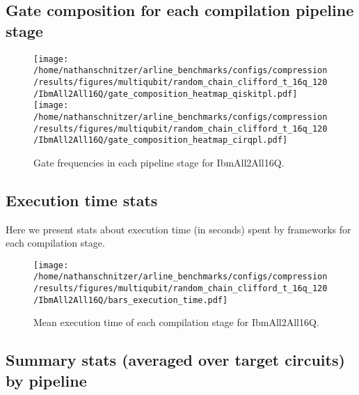 \documentclass{report}%
\begin{document}
%
\clearpage%
\subsection*{Gate composition for each compilation pipeline stage}%
\label{subsec:Gatecompositionforeachcompilationpipelinestage}%

%


\begin{figure}[h!]%
\centering%
\texttt{[image: /home/nathanschnitzer/arline\_benchmarks/configs/compression/results/figures/multiqubit/random\_chain\_clifford\_t\_16q\_120/IbmAll2All16Q/gate\_composition\_heatmap\_qiskitpl.pdf]}%
\centering%
\texttt{[image: /home/nathanschnitzer/arline\_benchmarks/configs/compression/results/figures/multiqubit/random\_chain\_clifford\_t\_16q\_120/IbmAll2All16Q/gate\_composition\_heatmap\_cirqpl.pdf]}%
\linebreak%
\caption{Gate frequencies in each pipeline stage for IbmAll2All16Q.}%
\end{figure}

%
\subsection*{Execution time stats }%
\label{subsec:Executiontimestats}%

%
Here we present stats about execution time (in seconds)
                spent by frameworks for each compilation stage.%


\begin{figure}[h!]%
\centering%
\texttt{[image: /home/nathanschnitzer/arline\_benchmarks/configs/compression/results/figures/multiqubit/random\_chain\_clifford\_t\_16q\_120/IbmAll2All16Q/bars\_execution\_time.pdf]}%
\caption{Mean execution time of each compilation stage for IbmAll2All16Q.}%
\end{figure}

%
\subsection*{Summary stats (averaged over target circuits) by pipeline}%
\label{subsec:Summarystats(averagedovertargetcircuits)bypipeline}%
\end{document}
